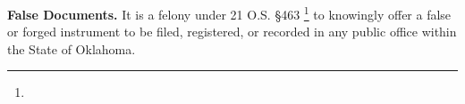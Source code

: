\textbf{False Documents.}
It is a felony under 21 O.S. \S463%
\footnote{\OklahomaComputerCrimesActFootnote}
to knowingly offer a false or forged instrument to be filed, registered, or
recorded in any public office within the State of Oklahoma.